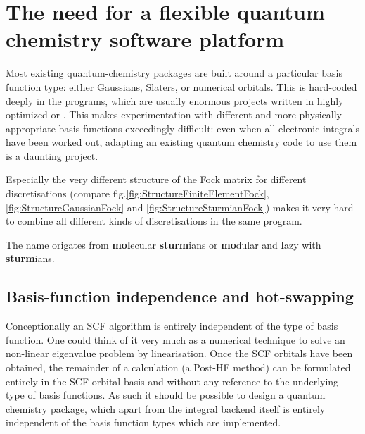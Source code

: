 \section{The need for a flexible quantum chemistry software platform}

%
%


Most existing quantum-chemistry packages
are built around a 
particular basis function type: either Gaussians,
Slaters, or numerical orbitals. This is hard-coded 
deeply in the programs, which are usually enormous
projects written in  highly optimized \cpp or \fortran.
This makes experimentation with different and more physically
appropriate basis functions exceedingly difficult:
even when all electronic integrals have been worked out,
adapting an existing quantum chemistry code to use
them is a daunting project.

Especially the very different structure of the Fock matrix for
different discretisations (compare fig.\vref{fig:StructureFiniteElementFock},
\vref{fig:StructureGaussianFock} and \vref{fig:StructureSturmianFock})
makes it very hard to combine all different kinds of discretisations
in the same program.

The name \molsturm origates from \textbf{mol}ecular \textbf{sturm}ians
or \textbf{mo}dular and \textbf{l}azy with \textbf{sturm}ians.




\subsection{Basis-function independence and hot-swapping}
Conceptionally an SCF algorithm is entirely independent of the type of basis function.
One could think of it very much as a numerical technique to solve
an non-linear eigenvalue problem by linearisation.
Once the SCF orbitals have been obtained,
the remainder of a calculation (\eg a Post-HF method)
can be formulated entirely in the SCF orbital basis
and without any reference to the underlying type of basis functions.
As such it should be possible to design a quantum chemistry package,
which apart from the integral backend itself is entirely independent
of the basis function types which are implemented.

